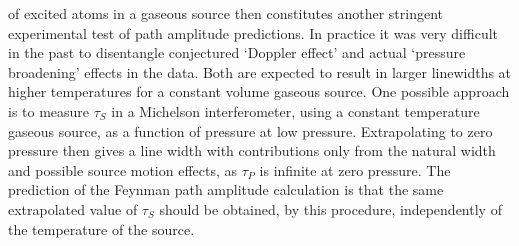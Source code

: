 \documentclass [12pt]{article}
\begin{document}
{    of excited atoms in a gaseous source then constitutes another stringent experimental
    test of path amplitude predictions. In practice it was very difficult in the past
    to disentangle
    conjectured `Doppler effect' and actual `pressure broadening' effects in the data. Both are expected to
    result in larger linewidths at higher temperatures for a constant volume gaseous
    source. One possible approach is to measure $\tau_S$ in a Michelson interferometer,
     using a constant temperature gaseous source, as a function of pressure at low pressure.
    Extrapolating to zero pressure then gives a line width with contributions only from
   the natural width and possible source motion effects, as $\tau_P$ is infinite at
    zero pressure. The prediction of the Feynman path amplitude calculation is that the same
    extrapolated value of $\tau_S$ should be obtained, by this procedure, independently of the temperature
    of the source.
  
}
\end{document}

